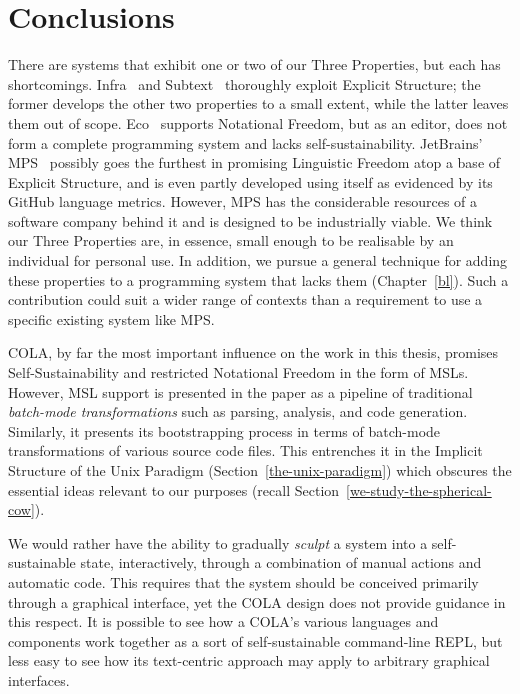 \documentclass[ twoside,openright,titlepage,numbers=noenddot,headinclude,footinclude,cleardoublepage=empty,abstract=on,
                BCOR=5mm,paper=a4,fontsize=11pt
                ]{scrreprt}
\theoremstyle{definition}
\begin{document}
\hypertarget{conclusions}{\section{Conclusions}\label{conclusions}}

There are systems that exhibit one or two of our Three Properties, but
each has shortcomings. Infra~\parencite{Infra} and
Subtext~\parencite{Subtext} thoroughly exploit Explicit Structure; the
former develops the other two properties to a small extent, while the
latter leaves them out of scope. Eco~\parencite{Eco} supports Notational
Freedom, but as an editor, does not form a complete programming system
and lacks self-sustainability. JetBrains' MPS~\parencite{MPS} possibly
goes the furthest in promising Linguistic Freedom atop a base of
Explicit Structure, and is even partly developed using itself as
evidenced by its GitHub language metrics. However, MPS has the
considerable resources of a software company behind it and is designed
to be industrially viable. We think our Three Properties are, in
essence, small enough to be realisable by an individual for personal
use. In addition, we pursue a general technique for adding these
properties to a programming system that lacks them (Chapter~\ref{bl}).
Such a contribution could suit a wider range of contexts than a
requirement to use a specific existing system like MPS.

\ac{COLA}, by far the most important influence on the work in this
thesis, promises Self-Sustainability and restricted Notational Freedom
in the form of \acp{MSL}. However, \ac{MSL} support is presented in the
paper \parencite{COLAs} as a pipeline of traditional \emph{batch-mode
transformations} such as parsing, analysis, and code generation.
Similarly, it presents its bootstrapping process in terms of batch-mode
transformations of various source code files. This entrenches it in the
Implicit Structure of the Unix Paradigm
(Section~\ref{the-unix-paradigm}) which obscures the essential ideas
relevant to our purposes (recall
Section~\ref{we-study-the-spherical-cow}).

We would rather have the ability to gradually \emph{sculpt} a system
into a self-sustainable state, interactively, through a combination of
manual actions and automatic code. This requires that the system should
be conceived primarily through a graphical interface, yet the \ac{COLA}
design does not provide guidance in this respect. It is possible to see
how a \ac{COLA}'s various languages and components work together as a
sort of self-sustainable command-line \ac{REPL}, but less easy to see
how its text-centric approach may apply to arbitrary graphical
interfaces.
\end{document}
